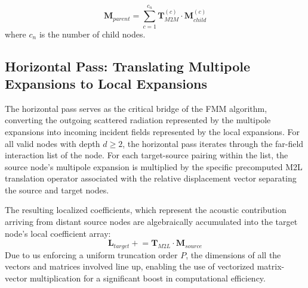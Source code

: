 \begin{equation}
    \mathbf{M}_{parent} = \sum_{c=1}^{c_n} \mathbf{T}_{M2M}^{(c)} \cdot \mathbf{M}_{child}^{(c)}
\end{equation}
where $c_n$ is the number of child nodes.
\subsection{Horizontal Pass: Translating Multipole Expansions to Local Expansions} \label{horizontal-pass}

The horizontal pass serves as the critical bridge of the \ac{FMM} algorithm, converting the outgoing scattered radiation represented by the multipole expansions into incoming incident fields represented by the local expansions.
For all valid nodes with depth $d\geq 2$, the horizontal pass iterates through the far-field interaction list of the node. For each target-source pairing within the list, the source node's multipole expansion is multiplied by the specific precomputed \ac{M2L} translation operator associated with the relative displacement vector separating the source and target nodes. 



The resulting localized coefficients, which represent the acoustic contribution arriving from distant source nodes are algebraically accumulated into the target node's local coefficient array:
\begin{equation}
    \mathbf{L}_{target} \mathrel{+}= \mathbf{T}_{M2L} \cdot \mathbf{M}_{source}
\end{equation}
Due to us enforcing a uniform truncation order $P$, the dimensions of all the vectors and matrices involved line up, enabling the use of vectorized matrix-vector multiplication for a significant boost in computational efficiency.

